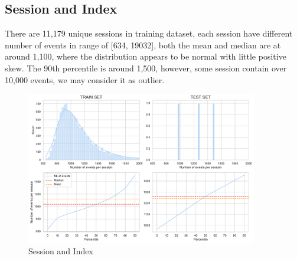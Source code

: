 \documentclass[11pt,a4paper]{article}
\begin{document}
    \subsection{Session and Index}
    There are 11,179 unique sessions in training dataset, each session have different number of events in range of [634, 19032], both the mean and median are at around 1,100, where the distribution appears to be normal with little positive skew. The 90th percentile is around 1,500, however, some session contain over 10,000 events, we may consider it as outlier.
    \begin{figure}[H]
        \centering
        \includegraphics[width = 0.9\textwidth]{EDA_plot/no_events.pdf}
        \caption{Session and Index}
        \label{fig:no_events}
    \end{figure}
\end{document}
